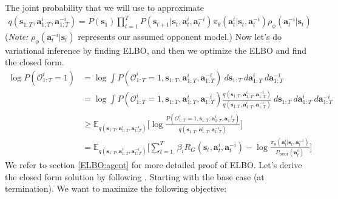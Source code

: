 \noindent
The joint probability that we will use to approximate 
\begin{equation}
    \begin{aligned}
        q(\boldsymbol{s}_{1:T}, \boldsymbol{a}^i_{1:T}, \boldsymbol{a}^{-i}_{1:T}) = P(\boldsymbol{s}_1) \prod^T_{t=1}
        P(\boldsymbol{s}_{t+1} | \boldsymbol{s}_{t}, \boldsymbol{a}^i_{t}, \boldsymbol{a}^{-i}_{t}) \pi_{\theta}(\boldsymbol{a}^i_t | \boldsymbol{s}_t, \boldsymbol{a}^{-i}_t) \rho_{\phi}(\boldsymbol{a}^{-i}_t | \boldsymbol{s}_t)
    \end{aligned}
\end{equation}
(\emph{Note: } $\rho_{\phi}(\boldsymbol{a}^{-i}_t | \boldsymbol{s}_t)$ represents our assumed opponent model.) Now let's do variational inference by finding ELBO, and then we optimize the ELBO and find the closed form.
\begin{equation}
    \label{equation:4}
    \begin{aligned}
        \log P(\mathcal{O}^i_{1:T} = 1) &= \log \int P(\mathcal{O}^i_{1:T} = 1, \boldsymbol{s}_{1:T}, \boldsymbol{a}^i_{1:T}, \boldsymbol{a}^{-i}_{1:T}) \ d\boldsymbol{s}_{1:T} \ d\boldsymbol{a}^i_{1:T} \ d\boldsymbol{a}^{-i}_{1:T} \\ 
        &= \log \int P(\mathcal{O}^i_{1:T} = 1, \boldsymbol{s}_{1:T}, \boldsymbol{a}^i_{1:T}, \boldsymbol{a}^{-i}_{1:T}) \frac{q(\boldsymbol{s}_{1:T}, \boldsymbol{a}^i_{1:T}, \boldsymbol{a}^{-i}_{1:T})}{q(\boldsymbol{s}_{1:T}, \boldsymbol{a}^i_{1:T}, \boldsymbol{a}^{-i}_{1:T})} \ d\boldsymbol{s}_{1:T} \ d\boldsymbol{a}^i_{1:T} \ d\boldsymbol{a}^{-i}_{1:T} \\
        &\ge \mathbb{E}_{q(\boldsymbol{s}_{1:T}, \boldsymbol{a}^i_{1:T}, \boldsymbol{a}^{-i}_{1:T})}\Bigg[ \log \frac{P(\mathcal{O}^i_{1:T} = 1, \boldsymbol{s}_{1:T}, \boldsymbol{a}^i_{1:T}, \boldsymbol{a}^{-i}_{1:T})}{q(\boldsymbol{s}_{1:T}, \boldsymbol{a}^i_{1:T}, \boldsymbol{a}^{-i}_{1:T})} \Bigg] \\
        &= \mathbb{E}_{q(\boldsymbol{s}_{1:T}, \boldsymbol{a}^i_{1:T}, \boldsymbol{a}^{-i}_{1:T})}\Bigg[\sum^{T}_{t=1} \ \beta_i R_G(\boldsymbol{s}_{t}, \boldsymbol{a}^i_{t}, \boldsymbol{a}^{-i}_{t}) - \log \frac{\pi_{\theta}(\boldsymbol{a}^i_t | \boldsymbol{s}_t, \boldsymbol{a}^{-i}_t)}{P_{\text{prior}}(\boldsymbol{a}^i_t)}\Bigg]
    \end{aligned}
\end{equation}
We refer to section \ref{ELBO:agent} for more detailed proof of ELBO.
Let's derive the closed form solution by following \cite{levine2018reinforcement}. Starting with the base case (at termination). We want to maximize the following objective: 
